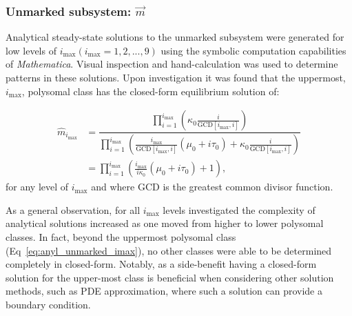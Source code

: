 \documentclass[review]{elsarticle}
\newcommand{\imax}{\ensuremath{i_{\max}}\xspace}
\newcommand{\mvec}{\ensuremath{\vec{m}}\xspace}
\newcommand{\GCD}{\ensuremath{\text{GCD}}\xspace}
\begin{document}
\subsubsection{Unmarked subsystem: \mvec}
Analytical steady-state solutions to the unmarked subsystem were generated for low levels of \imax $(\imax=1,2,...,9)$ using the symbolic computation capabilities of \emph{Mathematica}.
Visual inspection and hand-calculation was used to determine patterns in these solutions.
Upon investigation it was found that the uppermost, \imax, polysomal class has the closed-form equilibrium solution of:

\begin{align}
\hat{m}_{\imax} &= \dfrac{\prod_{i=1}^{\imax}\left(\kappa_0 \frac{i}{\GCD[\imax,i]}\right)}{\prod_{i=1}^{\imax}\left(\frac{\imax}{\GCD[\imax,i]}(\mu_0+i \tau_0)+\kappa_0 \frac{i}{\GCD[\imax,i]}\right)}\label{eq:anyl_unmarked_imax}\\
&=\prod_{i=1}^{\imax}{\left(\frac{\imax}{i\kappa_0}\left(\mu_0+i\tau_0\right)+1\right)},\label{eq:anyl_unmarked_imax_simp}
\end{align}
for any level of \imax and where \GCD is the greatest common divisor function.

As a general observation, for all \imax levels investigated the complexity of analytical solutions increased as one moved from higher to lower polysomal classes.
In fact, beyond the uppermost polysomal class (Eq~\ref{eq:anyl_unmarked_imax}), no other classes were able to be determined completely in closed-form.
Notably, as a side-benefit having a closed-form solution for the upper-most class is beneficial when considering other solution methods, such as PDE approximation, where such a solution can provide a boundary condition.
\end{document}
